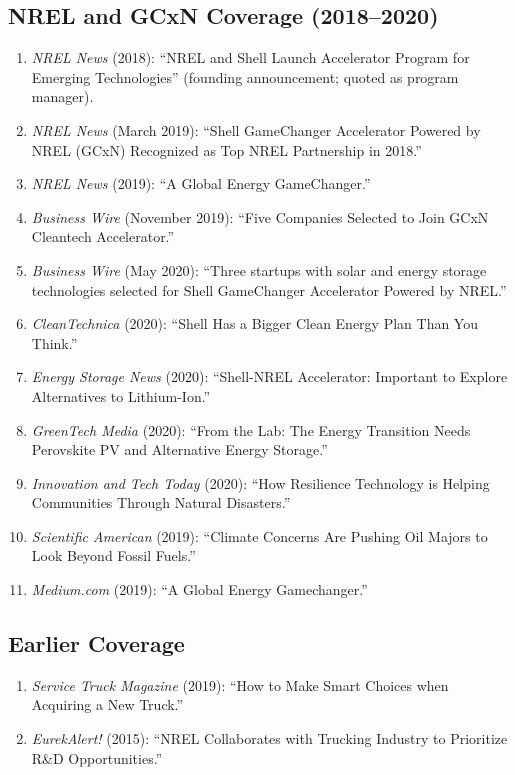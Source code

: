 \documentclass[11pt,letterpaper]{article}
\begin{document}
\subsection{NREL and GCxN Coverage (2018--2020)}

\begin{enumerate}[noitemsep]
  \item \textit{NREL News} (2018): ``NREL and Shell Launch Accelerator Program for Emerging Technologies'' (founding announcement; quoted as program manager).
  \item \textit{NREL News} (March 2019): ``Shell GameChanger Accelerator Powered by NREL (GCxN) Recognized as Top NREL Partnership in 2018.''
  \item \textit{NREL News} (2019): ``A Global Energy GameChanger.''
  \item \textit{Business Wire} (November 2019): ``Five Companies Selected to Join GCxN Cleantech Accelerator.''
  \item \textit{Business Wire} (May 2020): ``Three startups with solar and energy storage technologies selected for Shell GameChanger Accelerator Powered by NREL.''
  \item \textit{CleanTechnica} (2020): ``Shell Has a Bigger Clean Energy Plan Than You Think.''
  \item \textit{Energy Storage News} (2020): ``Shell-NREL Accelerator: Important to Explore Alternatives to Lithium-Ion.''
  \item \textit{GreenTech Media} (2020): ``From the Lab: The Energy Transition Needs Perovskite PV and Alternative Energy Storage.''
  \item \textit{Innovation and Tech Today} (2020): ``How Resilience Technology is Helping Communities Through Natural Disasters.''
  \item \textit{Scientific American} (2019): ``Climate Concerns Are Pushing Oil Majors to Look Beyond Fossil Fuels.''
  \item \textit{Medium.com} (2019): ``A Global Energy Gamechanger.''
\end{enumerate}

\subsection{Earlier Coverage}

\begin{enumerate}[noitemsep]
  \item \textit{Service Truck Magazine} (2019): ``How to Make Smart Choices when Acquiring a New Truck.''
  \item \textit{EurekAlert!} (2015): ``NREL Collaborates with Trucking Industry to Prioritize R\&D Opportunities.''
\end{enumerate}

\end{document}
